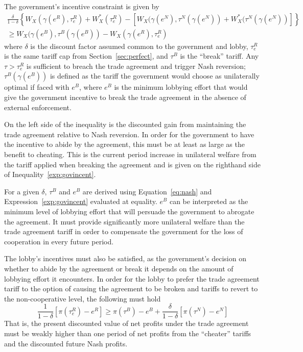 \documentclass[12pt]{article}
\newcommand{\ga}{\gamma}
\newcommand{\de}{\delta}
\begin{document}
The government's incentive constraint is given by
  \begin{multline}
    \frac{\de}{1-\de} \left\{W_X(\ga(e^R),\tau_e^R) + W_X^*(\tau_e^R) - \left[W_X(\ga(e^N),\tau^N(\ga(e^N)) + W_X^*(\tau^N(\ga(e^N)) \right] \right\} \\ \geq W_X(\ga(e^B),\tau^B(\ga(e^B)) - W_X(\ga(e^R),\tau_e^R)
		\label{exp:govincent}
  \end{multline}
where $\de$ is the discount factor assumed common to the government and lobby, $\tau_e^R$ is the same tariff cap from Section~\ref{sec:perfect}, and $\tau^B$ is the ``break'' tariff. Any $\tau > \tau_e^R$ is sufficient to breach the trade agreement and trigger Nash reversion; $\tau^B(\ga(e^B))$ is defined as the tariff the government would choose as unilaterally optimal if faced with $e^B$, where $e^B$ is the minimum lobbying effort that would give the government incentive to break the trade agreement in the absence of external enforcement.

On the left side of the inequality is the discounted gain from maintaining the trade agreement relative to Nash reversion. In order for the government to have the incentive to abide by the agreement, this must be at least as large as the benefit to cheating. This is the current period increase in unilateral welfare from the tariff applied when breaking the agreement and is given on the righthand side of Inequality~\ref{exp:govincent}.

For a given $\de$, $\tau^B$ and $e^B$ are derived using Equation~\ref{eq:nash} and Expression~\ref{exp:govincent} evaluated at equality. $e^B$ can be interpreted as the minimum level of lobbying effort that will persuade the government to abrogate the agreement. It must provide significantly more unilateral welfare than the trade agreement tariff in order to compensate the government for the loss of cooperation in every future period.

The lobby's incentives must also be satisfied, as the government's decision on whether to abide by the agreement or break it depends on the amount of lobbying effort it encounters. In order for the lobby to prefer the trade agreement tariff to the option of causing the agreement to be broken and tariffs to revert to the non-cooperative level, the following must hold
\begin{equation}
  \frac{1}{1-\de}\left[\pi(\tau_e^R) - e^R\right] \geq \pi(\tau^B) - e^B + \frac{\de}{1-\de}\left[\pi(\tau^N) - e^N\right]
	\label{exp:lobby}
\end{equation}
That is, the present discounted value of net profits under the trade agreement must be weakly higher than one period of net profits from the ``cheater'' tariffs and the discounted future Nash profits.
\end{document}
